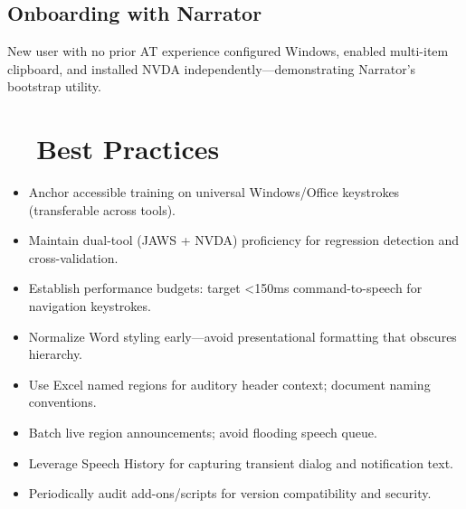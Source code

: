 \subsection*{Onboarding with Narrator}
New user with no prior AT experience configured Windows, enabled multi-item clipboard, and installed NVDA independently—demonstrating Narrator’s bootstrap utility.

\section{~~Best Practices}
\label{sec:sr25-best-practices}
\begin{itemize}
	\item Anchor accessible training on universal Windows/Office keystrokes (transferable across tools).
	\item Maintain dual-tool (JAWS + NVDA) proficiency for regression detection and cross-validation.
	\item Establish performance budgets: target <150ms command-to-speech for navigation keystrokes.
	\item Normalize Word styling early—avoid presentational formatting that obscures hierarchy.
	\item Use Excel named regions for auditory header context; document naming conventions.
	\item Batch live region announcements; avoid flooding speech queue.
	\item Leverage Speech History for capturing transient dialog and notification text.
	\item Periodically audit add-ons/scripts for version compatibility and security.
\end{itemize}

